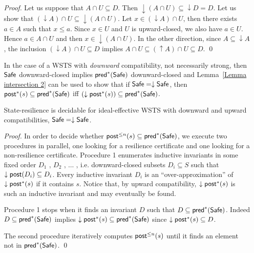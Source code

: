 \begin{proof}
Let us suppose that $A \cap U \subseteq D$. Then ${\downarrow (A \cap U)} \subseteq {\downarrow D} = D$. Let us show that $({\downarrow A}) \cap U \subseteq {\downarrow (A \cap U)}$. Let $x \in ({\downarrow A}) \cap U$, then there exists $a \in A$ such that $x \leq a$. Since $x \in U$ and $U$ is upward-closed, we also have $a \in U$. Hence $a \in A \cap U$ and then $x \in { \downarrow (A \cap U)}$. In the other direction, since $A \subseteq {\downarrow A}$, the inclusion $({\downarrow  A}) \cap U \subseteq D$ implies $A \cap U \subseteq ({\uparrow  A}) \cap U \subseteq D$. \qed
\end{proof}


In the case of a WSTS with \emph{downward} compatibility, not necessarily strong,
then $\textsf{Safe}$ downward-closed implies $\textsf{pred}^*(\textsf{Safe})$ downward-closed and
Lemma~\ref{Lemma intersection 2} can be used to show that
if $\textsf{Safe} = \downarrow \textsf{Safe}$,
then
$\post^*(s) %
\subseteq \pred^*(\Safe)$  iff $ (\downarrow  \textsf{post}^*(s)) 
\subseteq \textsf{pred}^*(\textsf{Safe})$.


\begin{theorem}\label{downward srp}
{\sc State-resilience} is decidable for ideal-effective WSTS with downward and upward compatibilities,
$\textsf{Safe} = \downarrow \textsf{Safe}$.
\end{theorem}

\begin{proof}
In order to decide whether $\post^{\leq n}(s) %
 \subseteq \pred^*(\Safe)$, we execute two procedures in parallel,
one looking for a resilience certificate and one looking for a non-resilience certificate.
Procedure 1 enumerates inductive invariants in some fixed order $D_1$ , $D_2$ , $\ldots$ , i.e. downward-closed subsets $D_i \subseteq S$ such that $\downarrow \textsf{post}(D_i ) \subseteq D_i$. 
Every inductive invariant $D_i$ is an “over-approximation” of $\downarrow \textsf{post}^*(s)$ if it contains $s$.
Notice that, by 
upward compatibility, $\downarrow \textsf{post}^*(s)$ is such an inductive invariant and may eventually be found.

Procedure 1 stops when it finds an invariant $D$ such that
$D  %
 \subseteq \pred^*(\Safe)$. 
Indeed
$D %
\subseteq  \pred^*(\Safe)$ implies
$\downarrow \post^*(s) %
 \subseteq  \pred^*(\Safe)$
since $ \downarrow \textsf{post}^*(s)  \subseteq D$.

The second procedure iteratively computes
$\post^{\leq n}(s) %
$
until it finds an element
not in $\textsf{pred}^*(\textsf{Safe})$. \qed
\end{proof}



